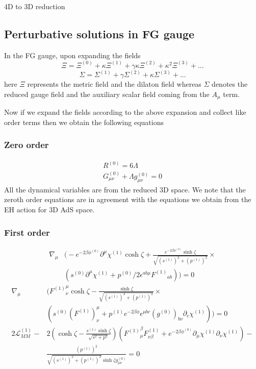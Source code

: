 \begin{frame}[allowframebreaks]{4D to 3D reduction \cite{Dharewa2024}}
\subsection{Perturbative solutions in FG gauge}
In the FG gauge, upon expanding the fields 
\begin{equation}
    \Xi = \Xi^{(0)} + \kappa \Xi^{(1)} + \gamma \kappa \Xi^{(2)} + \kappa^2 \Xi^{(3)} + ...
\end{equation}
\begin{equation}
    \Sigma = \Sigma^{(1)} + \gamma \Sigma^{(2)} + \kappa \Sigma^{(3)} + ...
\end{equation}
here $\Xi$ represents the metric field and the dilaton field whereas $\Sigma$ denotes the reduced gauge field and the auxiliary scalar field coming from the $A_\mu$ term. 

Now if we expand the fields according to the above expansion and collect like order terms then we obtain the following equations 
\subsubsection{Zero order}
\begin{align}
    R^{(0)} = 6\Lambda \\ 
    G_{\mu\nu}^{(0)} + \Lambda g_{\mu\nu}^{(0)} = 0
\end{align}
All the dynamical variables are from the reduced 3D space. We note that the zeroth order equations are in agreement with the equations we obtain from the EH action for 3D AdS space. 


\subsubsection{First order}
\begin{align}
    \nabla_{\mu}& \Biggl ( -e^{-2\beta\phi^{(0)}} \partial^\mu\chi^{(1)}\cosh\zeta + \frac{e^{-2\beta\phi^{(0)}}\sinh\zeta}{\sqrt{(s^{(1)})^2 + (p^{(1)})^2} } \times \nonumber \\ & \left ( s^{(0)}\partial^\mu\chi^{(1)} + p^{(0)}/2 \epsilon^{ab\mu}{F^{(1)}}_{ab}\right ) \Biggl ) = 0
\end{align}
\begin{align}
    \nabla_{\mu}& \Biggl ( {F^{(1)}}^\mu_\nu\cosh\zeta - \frac{\sinh\zeta}{\sqrt{(s^{(1)})^2 + (p^{(1)})^2} } \times \nonumber \\ & \left ( s^{(0)}(F^{(1)})^\mu_\nu + p^{(1)}e^{-2\beta\phi}\epsilon^{\mu bc}(g^{(0)})_{b\nu} \partial_c \chi^{(1)}\right ) \Biggl ) = 0 \\ 
2\mathcal{L}^{(1)}_{MM} - &2 \left ( \cosh \zeta - \frac{s^{(1)}\sinh\zeta}{\sqrt{s^2+p^2} } \right ) \left ( {F^{(1)}}^\beta_\mu {F^{(1)}_{\nu\beta}} + e^{-2\beta\phi^{(0)}}\partial_\mu\chi^{(1)}\partial_\nu\chi^{(1)} \right ) - \nonumber \\ & \frac{(p^{(1)})^2}{\sqrt{(s^{(1)})^2+(p^{(1)})^2}\sinh\zeta {g^{(0)}_{\mu\nu}} } = 0
\end{align}


\end{frame}

